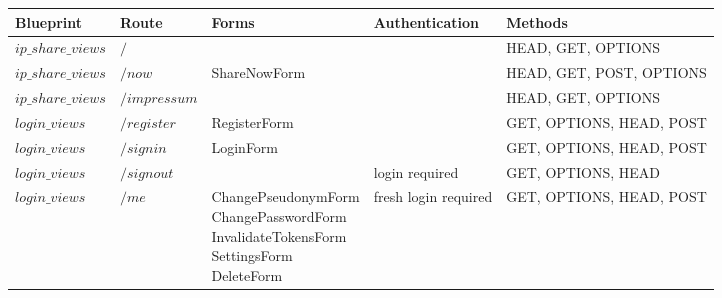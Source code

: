 \begin{table}
    \centering
    \begin{tabular}{|l|l|l|l|l|}
        \hline
        \textbf{Blueprint} & \textbf{Route}                   & \textbf{Forms}                                                                                    & \textbf{Authentication} & \textbf{Methods}         \\
        \hline
        $ip\_share\_views$ & \tiny $/$                              &                                                                                                   &                         & HEAD, GET, OPTIONS       \\
        \hline
        $ip\_share\_views$ & \tiny $/now$                           & ShareNowForm                                                                                      &                         & HEAD, GET, POST, OPTIONS \\
        \hline
        $ip\_share\_views$ & \tiny $/impressum$                     &                                                                                                   &                         & HEAD, GET, OPTIONS       \\
        \hline
        $login\_views$     & \tiny $/register$                      & RegisterForm                                                                                      &                         & GET, OPTIONS, HEAD, POST \\
        \hline
        $login\_views$     & \tiny $/signin$                        & LoginForm                                                                                         &                         & GET, OPTIONS, HEAD, POST \\
        \hline
        $login\_views$     & \tiny $/signout$                       &                                                                                                   & login required          & GET, OPTIONS, HEAD       \\
        \hline
        $login\_views$     & \tiny $/me$                            & \parbox{5cm}{\vspace{1mm} ChangePseudonymForm \\ ChangePasswordForm \\ InvalidateTokensForm \\ SettingsForm \\ DeleteForm \vspace{1mm}} & fresh login required & GET, OPTIONS, HEAD, POST \\

\end{tabular}
\end{table}
